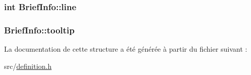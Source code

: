 \subsubsection[{line}]{\setlength{\rightskip}{0pt plus 5cm}int Brief\+Info\+::line}\label{struct_brief_info_adae4029a5e60d63720902578c56fd95b}
\hypertarget{struct_brief_info_a5b7799657df3d9b893527be844a55562}{}
\subsubsection[{tooltip}]{ Brief\+Info\+::tooltip}\label{struct_brief_info_a5b7799657df3d9b893527be844a55562}


La documentation de cette structure a été générée à partir du fichier suivant \+:\begin{DoxyCompactItemize}
\item 
src/\hyperlink{definition_8h}{definition.\+h}\end{DoxyCompactItemize}
